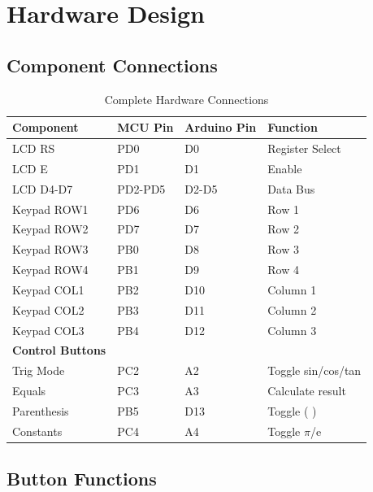 \documentclass{article}
\begin{document}
\section{Hardware Design}

\subsection{Component Connections}

\begin{table}[H]
\centering
\caption{Complete Hardware Connections}
\label{tab:connections}
\begin{tabular}{llll}
\toprule
\textbf{Component} & \textbf{MCU Pin} & \textbf{Arduino Pin} & \textbf{Function} \\
\midrule
LCD RS & PD0 & D0 & Register Select \\
LCD E & PD1 & D1 & Enable \\
LCD D4-D7 & PD2-PD5 & D2-D5 & Data Bus \\
Keypad ROW1 & PD6 & D6 & Row 1 \\
Keypad ROW2 & PD7 & D7 & Row 2 \\
Keypad ROW3 & PB0 & D8 & Row 3 \\
Keypad ROW4 & PB1 & D9 & Row 4 \\
Keypad COL1 & PB2 & D10 & Column 1 \\
Keypad COL2 & PB3 & D11 & Column 2 \\
Keypad COL3 & PB4 & D12 & Column 3 \\
\midrule
\textbf{Control Buttons} & & & \\
Trig Mode & PC2 & A2 & Toggle sin/cos/tan \\
Equals & PC3 & A3 & Calculate result \\
Parenthesis & PB5 & D13 & Toggle ( ) \\
Constants & PC4 & A4 & Toggle $\pi$/e \\
\bottomrule
\end{tabular}
\end{table}

\subsection{Button Functions}
\end{document}
